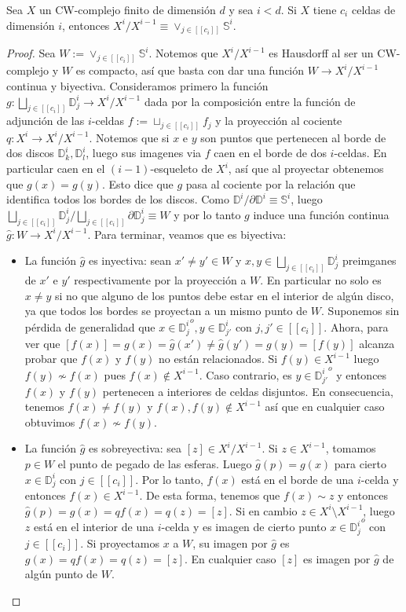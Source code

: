\documentclass[11pt]{article}
\newcommand{\D}{\mathbb{D}}
\newcommand{\Ss}{\mathbb{S}}
\newcommand{\tint}[1]{#1^o}
\newcommand{\nat}[1]{[\![#1]\!]}
\newcommand{\paint}[1]{\color{color}{#1}}
\newenvironment{lemma}[2][Lema]{\begin{trivlist}
\item[\hskip \labelsep \paint{{\bfseries #1}}\hskip \labelsep {\bfseries #2.}]}{\end{trivlist}}
\begin{document}
\begin{lemma}{2} Sea $X$ un CW-complejo finito de dimensi\'on $d$ y sea $i < d$. Si $X$ tiene $c_i$ celdas de dimensi\'on $i$, entonces $X^i/X^{i-1} \equiv \vee_{j \in \nat{c_i}}\Ss^i$.
\end{lemma}
\begin{proof} Sea $W := \vee_{j \in \nat{c_i}}\Ss^i$. Notemos que $X^i/X^{i-1}$ es Hausdorff al ser un CW-complejo y $W$ es compacto, as\'i que basta con dar una funci\'on $W \to X^i/X^{i-1}$ continua y biyectiva. Consideramos primero la funci\'on $g : \bigsqcup_{j \in \nat{c_i}}\D^i_j \to X^i/X^{i-1}$ dada por la composici\'on entre la funci\'on de adjunci\'on de las $i$-celdas $f := \sqcup_{j \in \nat{c_i}}f_j$ y la proyecci\'on al cociente $q : X^i \to X^i/X^{i-1}$. Notemos que si $x$ e $y$ son puntos que pertenecen al borde de dos discos $\D^i_k, \D^i_l$, luego sus imagenes via $f$ caen en el borde de dos $i$-celdas. En particular caen en el $(i-1)$-esqueleto de $X^i$, as\'i que al proyectar obtenemos que $g(x) = g(y)$. Esto dice que $g$ pasa al cociente por la relaci\'on que identifica todos los bordes de los discos. Como $\D^i/\partial \D^i \equiv \Ss^i$, luego $\bigsqcup_{j \in \nat{c_i}}\D^i_j/\bigsqcup_{j \in \nat{c_i}} \partial\D_j^i \equiv W$ y por lo tanto $g$ induce una funci\'on continua $\hat{g} : W \to X^i/X^{i-1}$. Para terminar, veamos que es biyectiva: 
\begin{itemize}
\item[$\bullet$] La funci\'on $\hat{g}$ es inyectiva: sean $x' \neq y' \in W$ y $x,y \in \bigsqcup_{j \in \nat{c_i}}\D^i_j$ preimganes de $x'$ e $y'$ respectivamente por la proyecci\'on a $W$. En particular no solo es $x \neq y$ si no que alguno de los puntos debe estar en el interior de alg\'un disco, ya que todos los bordes se proyectan a un mismo punto de $W$. Suponemos sin p\'erdida de generalidad que $x \in \tint{{\D^i_j}}, y \in \D^i_{j'}$ con $j,j' \in \nat{c_i}$. Ahora, para ver que $[f(x)] = g(x) = \hat{g}(x') \neq \hat{g}(y') = g(y) = [f(y)]$ alcanza probar que $f(x)$ y $f(y)$ no est\'an relacionados. Si $f(y) \in X^{i-1}$ luego $f(y) \not \sim f(x)$ pues $f(x) \not \in X^{i-1}$. Caso contrario, es $y \in \tint{{\D^i_{j'}}}$ y entonces $f(x)$ y $f(y)$ pertenecen a interiores de celdas disjuntos. En consecuencia, tenemos $f(x) \neq f(y)$ y $f(x),f(y) \not \in X^{i-1}$ as\'i que en cualquier caso obtuvimos $f(x) \not \sim f(y)$.
\item[$\bullet$] La funci\'on $\hat{g}$ es sobreyectiva: sea $[z] \in X^i/X^{i-1}$. Si $z \in X^{i-1}$, tomamos $p \in W$ el punto de pegado de las esferas. Luego $\hat{g}(p) = g(x)$ para cierto $x \in \D^i_j$ con $j \in \nat{c_i}$. Por lo tanto, $f(x)$ est\'a en el borde de una $i$-celda y entonces $f(x) \in X^{i-1}$. De esta forma, tenemos que $f(x) \sim z$ y entonces $\hat{g}(p) = g(x) = qf(x) = q(z) = [z]$. Si en cambio $z \in X^i \setminus X^{i-1}$, luego $z$ est\'a en el interior de una $i$-celda y es imagen de cierto punto $x \in \tint{{\D^i_j}}$ con $j \in \nat{c_i}$. Si proyectamos $x$ a $W$, su imagen por $\hat{g}$ es $g(x) = qf(x) = q(z) = [z]$. En cualquier caso $[z]$ es imagen por $\hat{g}$ de alg\'un punto de $W$.
\end{itemize}
\end{proof}
\end{document}
